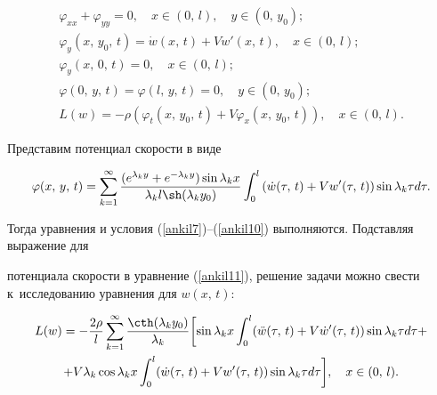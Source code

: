 \begin{gather}

\label{ankil7}

\varphi _{xx} + \varphi _{yy} = 0,

\quad x \in (0,\,l), \quad y \in (0,\,y_0);\\

\label{ankil8}

\varphi _y (x,\,y_0,\,t) = \dot w (x,\,t) +

V w' (x,\,t), \quad x \in (0,\,l);\\

\label{ankil9}

\varphi_y (x,\,0,\,t) = 0, \quad

x \in (0,\,l); \\

\label{ankil10}

\varphi (0,\,y,\,t) =  \varphi (l,\,y,\,t) = 0,

\quad y \in (0,\,y_0);\\

\label{ankil11}

L (w) = - \rho (\varphi _t ( x,\,y_0,\,t ) + V \varphi _x (x,\,y_0,\,t)),\quad x \in (0,\,l).

\end{gather}



Представим потенциал скорости в виде

$$

\varphi (x,\,y,\,t ) = \sum \limits_{k = 1}^\infty

\frac{( e^{\lambda _k y} + e^{ - \lambda _k y}

) \sin \lambda _k x}{\lambda _k l \sh ( \lambda _k y_0 )} \int _0^l \left( \dot w (\tau ,\,t ) +

V w' (\tau ,\,t ) \right) \sin \lambda_k \tau d\tau.

$$

Тогда уравнения и условия (\ref{ankil7})--(\ref{ankil10}) выполняются. Подставляя выражение для

потенциала скорости в уравнение (\ref{ankil11}), решение задачи можно свести к~исследованию уравнения для $w (x,\,t)$:

\begin{multline}

 L ( w ) = - \frac{2 \rho}{l} \sum\limits_{k = 1}^\infty

\frac{ \cth (\lambda _k y_0)}{\lambda _k}  

\biggl[ \sin \lambda_k x \int _0^l (\ddot {w}(\tau,\,t )

+ V \dot {w}' (\tau,\,t)) \sin \lambda _k \tau d \tau + \\

\label{ankil12}

+ V \lambda_k \cos \lambda_k x \int _0^l (\dot w (\tau,\,t) + V w' (\tau,\,t)) \sin

\lambda _k \tau d \tau  \biggr], \quad x \in (0,\,l).

\end{multline}




